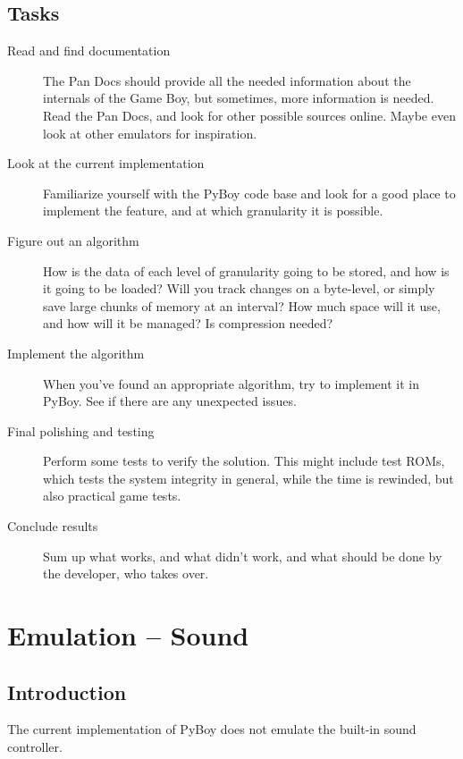 \documentclass[11pt]{report} %
\begin{document}
\section*{Tasks}
\begin{description}
    \item [Read and find documentation]
        The Pan Docs should provide all the needed information about the internals of the Game Boy, but sometimes, more information is needed. Read the Pan Docs, and look for other possible sources online. Maybe even look at other emulators for inspiration.

    \item [Look at the current implementation]
        Familiarize yourself with the PyBoy code base and look for a good place to implement the feature, and at which granularity it is possible.

    \item [Figure out an algorithm]
        How is the data of each level of granularity going to be stored, and how is it going to be loaded? Will you track changes on a byte-level, or simply save large chunks of memory at an interval? How much space will it use, and how will it be managed? Is compression needed?

    \item [Implement the algorithm]
        When you've found an appropriate algorithm, try to implement it in PyBoy. See if there are any unexpected issues.

    \item [Final polishing and testing]
        Perform some tests to verify the solution. This might include test ROMs, which tests the system integrity in general, while the time is rewinded, but also practical game tests.

    \item [Conclude results]
        Sum up what works, and what didn't work, and what should be done by the developer, who takes over.

\end{description}


\chapter*{Emulation -- Sound}
\section*{Introduction}
The current implementation of PyBoy does not emulate the built-in sound controller.
\end{document}
